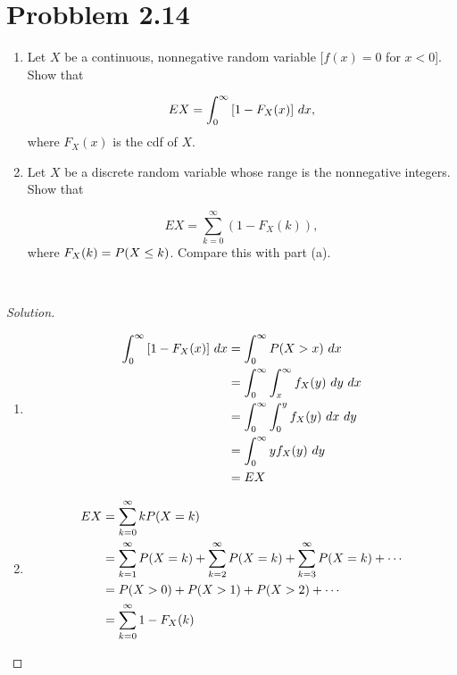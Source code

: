 \documentclass[12pt,letterpaper,reqno]{amsart}
\numberwithin{equation}{subsection}
\begin{document}
\newpage
\section{Probblem 2.14}

\begin{enumerate}[label=(\alph*),leftmargin=*]
    \item Let $X$ be a continuous, nonnegative random variable [$f(x) = 0$ for $x < 0$]. Show that
    
    \[ EX = \myint{[1-F_X(x)]}{x}{0}{\infty}, \]
    where $F_X(x)$ is the cdf of $X$.
    
    \item Let $X$ be a discrete random variable whose range is the nonnegative integers. Show that
    
    \[ EX = \sum_{k=0}^{\infty} (1-F_X(k)), \]
    where $F_X(k) = \fun{P}{X \leq k}$. Compare this with part (a).
\end{enumerate}~\\

\begin{proof}[Solution]~\\

\begin{enumerate}[label=(\alph*),leftmargin=*]
    \item 
    
    \begin{align*}
        \myint{[1-F_X(x)]}{x}{0}{\infty} &= \myint{P(X > x)}{x}{0}{\infty} \\
        &= \myint{\myint{f_X(y)}{y}{x}{\infty}}{x}{0}{\infty} \\
        &= \myint{\myint{f_X(y)}{x}{0}{y}}{y}{0}{\infty} \\
        &= \myint{yf_X(y)}{y}{0}{\infty} \\
        &= EX
    \end{align*}
    
    \item
    
    \begin{align*}
        EX &= \sum_{k=0}^{\infty} k \fun{P}{X = k} \\
           &= \sum_{k=1}^{\infty} \fun{P}{X=k} + \sum_{k=2}^{\infty} \fun{P}{X=k} + \sum_{k=3}^{\infty} \fun{P}{X=k} + \cdots \\
           &= \fun{P}{X > 0} + \fun{P}{X > 1} + \fun{P}{X > 2} + \cdots \\
           &= \sum_{k=0}^{\infty} 1-F_X(k)
    \end{align*}
\end{enumerate}
\end{proof}
\end{document}

